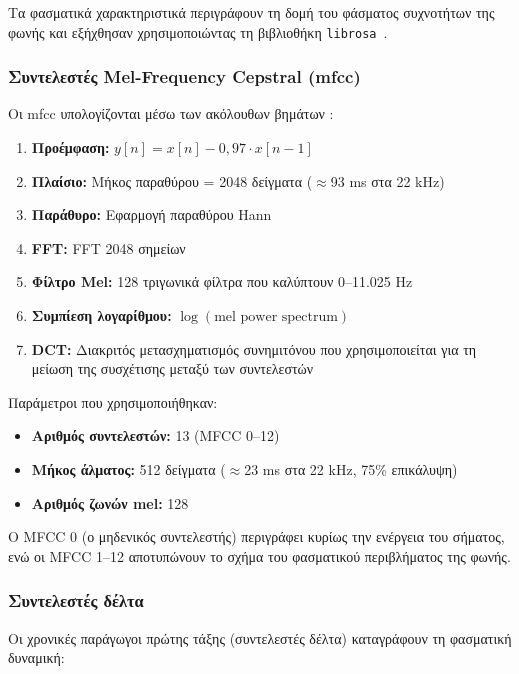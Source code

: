 Τα φασματικά χαρακτηριστικά περιγράφουν τη δομή του φάσματος συχνοτήτων της φωνής και εξήχθησαν χρησιμοποιώντας τη βιβλιοθήκη \texttt{librosa}~\citep{librosa2020}.

\subsubsection{Συντελεστές Mel-Frequency Cepstral (\gls{mfcc})}

Οι \gls{mfcc} υπολογίζονται μέσω των ακόλουθων βημάτων \citep{davis1980comparison}:

\begin{enumerate}
    \item \textbf{Προέμφαση:} $y[n] = x[n] - 0{,}97 \cdot x[n-1]$
    \item \textbf{Πλαίσιο:} Μήκος παραθύρου = 2048 δείγματα ($\approx$93 ms στα 22 kHz)
    \item \textbf{Παράθυρο:} Εφαρμογή παραθύρου Hann
    \item \textbf{FFT:} FFT 2048 σημείων
    \item \textbf{Φίλτρο Mel:} 128 τριγωνικά φίλτρα που καλύπτουν 0--11.025 Hz
    \item \textbf{Συμπίεση λογαρίθμου:} $\log(\text{mel power spectrum})$
    \item \textbf{DCT:} Διακριτός μετασχηματισμός συνημιτόνου που χρησιμοποιείται για τη μείωση της συσχέτισης μεταξύ των συντελεστών
\end{enumerate}

Παράμετροι που χρησιμοποιήθηκαν:
\begin{itemize}
    \item \textbf{Αριθμός συντελεστών:} 13 (MFCC 0--12)
    \item \textbf{Μήκος άλματος:} 512 δείγματα ($\approx$23 ms στα 22 kHz, 75\% επικάλυψη)
    \item \textbf{Αριθμός ζωνών mel:} 128
\end{itemize}

Ο MFCC 0 (ο μηδενικός συντελεστής) περιγράφει κυρίως την ενέργεια του σήματος, ενώ οι MFCC 1–12 αποτυπώνουν το σχήμα του φασματικού περιβλήματος της φωνής.

\subsubsection{Συντελεστές δέλτα}

Οι χρονικές παράγωγοι πρώτης τάξης (συντελεστές δέλτα) καταγράφουν τη φασματική δυναμική:

